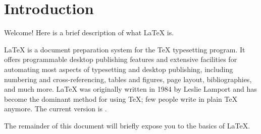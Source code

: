 
\chapter{Introduction}%

\label{ch:introduction}%

\graphicspath{{chapters/introduction/figures/}}

Welcome! Here is a brief description of what \LaTeX{} is.

\LaTeX{} is a document preparation system for the \TeX{} typesetting program.
It offers programmable desktop publishing features and extensive facilities for automating most aspects of typesetting and desktop publishing, including numbering and cross-referencing, tables and figures, page layout, bibliographies, and much more.
\LaTeX{} was originally written in 1984 by Leslie Lamport and has become the dominant method for using \TeX{}; few people write in plain \TeX{} anymore.
The current version is \LaTeXe{}.

The remainder of this document will briefly expose you to the basics of \LaTeX{}.
